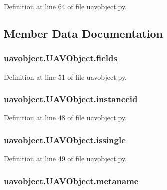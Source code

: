 Definition at line 64 of file uavobject.\-py.



\subsection{Member Data Documentation}
\hypertarget{classuavobject_1_1_u_a_v_object_af9ce81de37f806ae8b2b50bfa9e6c72b}{
\subsubsection[{fields}]{\setlength{\rightskip}{0pt plus 5cm}uavobject.\-U\-A\-V\-Object.\-fields}}\label{classuavobject_1_1_u_a_v_object_af9ce81de37f806ae8b2b50bfa9e6c72b}


Definition at line 51 of file uavobject.\-py.

\hypertarget{classuavobject_1_1_u_a_v_object_a012fd4a0732970d3c5c010b073ad8f94}{
\subsubsection[{instanceid}]{\setlength{\rightskip}{0pt plus 5cm}uavobject.\-U\-A\-V\-Object.\-instanceid}}\label{classuavobject_1_1_u_a_v_object_a012fd4a0732970d3c5c010b073ad8f94}


Definition at line 48 of file uavobject.\-py.

\hypertarget{classuavobject_1_1_u_a_v_object_af380208f7a1b06c39870e351d7dfc803}{
\subsubsection[{issingle}]{\setlength{\rightskip}{0pt plus 5cm}uavobject.\-U\-A\-V\-Object.\-issingle}}\label{classuavobject_1_1_u_a_v_object_af380208f7a1b06c39870e351d7dfc803}


Definition at line 49 of file uavobject.\-py.

\hypertarget{classuavobject_1_1_u_a_v_object_af6ccf832bcb7ad216b1b7e5461ceb39e}{
\subsubsection[{metaname}]{\setlength{\rightskip}{0pt plus 5cm}uavobject.\-U\-A\-V\-Object.\-metaname}}\label{classuavobject_1_1_u_a_v_object_af6ccf832bcb7ad216b1b7e5461ceb39e}


